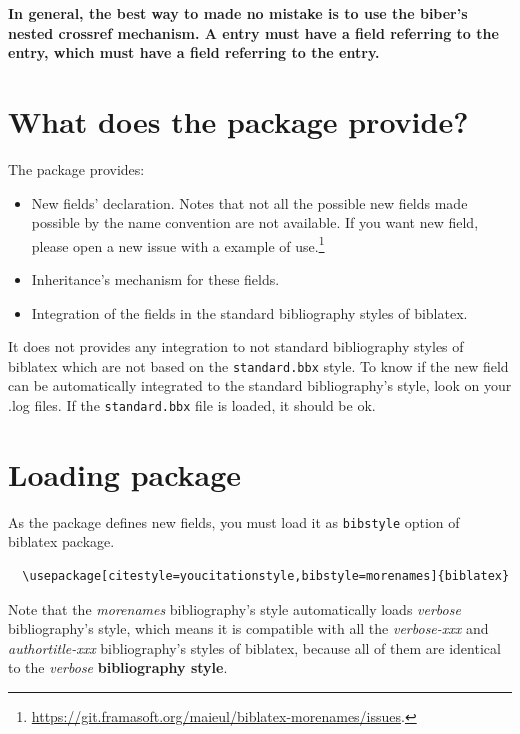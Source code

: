 \documentclass{ltxdockit}[2011/03/25]
\newcommand{\biblatex}{biblatex\xspace}
\begin{document}
\textbf{In general, the best way to made no mistake is to use the biber's nested crossref mechanism. A  entry must have a  field referring to the  entry, which must have a  field referring to the  entry.}

\section{What does the package provide?}

The package provides:
\begin{itemize}
  \item New fields' declaration. Notes that not all the possible new fields made possible  by the name convention are not available. If you want new field, please open a new issue with a example of use.\footnote{\url{https://git.framasoft.org/maieul/biblatex-morenames/issues}.}
  \item Inheritance's mechanism for these fields.
  \item Integration of the fields in the standard bibliography styles of biblatex. 
\end{itemize}

It does not provides any integration to not standard bibliography styles of biblatex which are not based on the \verb+standard.bbx+ style.
To know if the new field can be automatically integrated to the standard bibliography's style, look on your .log files. If the \verb+standard.bbx+ file is loaded, it should be ok.

\section{Loading package}
As the package defines new fields, you must load it as \verb+bibstyle+ option of \biblatex package.
 
\begin{verbatim}
  \usepackage[citestyle=youcitationstyle,bibstyle=morenames]{biblatex}
\end{verbatim}



Note that the \emph{morenames} bibliography's style automatically loads \emph{verbose} bibliography's style, which means it is  compatible with all the \emph{verbose-xxx} and \emph{authortitle-xxx} bibliography's  styles of \biblatex, because all of them are identical to the \emph{verbose} \textbf{bibliography style}.
 
\end{document}
